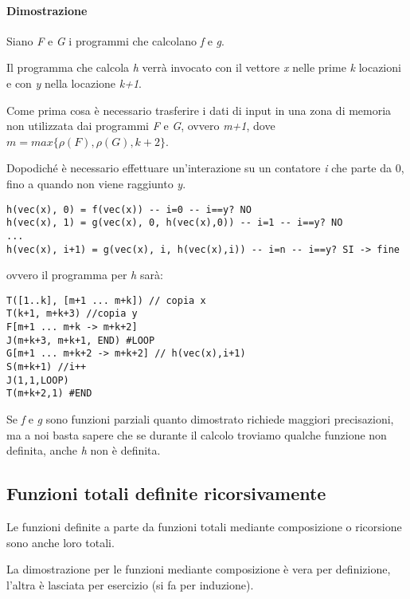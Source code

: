 \paragraph{Dimostrazione}\label{dimostrazione-1}

Siano \emph{F} e \emph{G} i programmi che calcolano \emph{f} e \emph{g}.

Il programma che calcola \emph{h} verrà invocato con il vettore \emph{x}
nelle prime \emph{k} locazioni e con \emph{y} nella locazione
\emph{k+1}.

Come prima cosa è necessario trasferire i dati di input in una zona di
memoria non utilizzata dai programmi \emph{F} e \emph{G}, ovvero
\emph{m+1}, dove $m = max\{\rho(F), \rho(G), k+2\}$.

Dopodiché è necessario effettuare un'interazione su un contatore
\emph{i} che parte da 0, fino a quando non viene raggiunto \emph{y}.

\begin{verbatim}
h(vec(x), 0) = f(vec(x)) -- i=0 -- i==y? NO
h(vec(x), 1) = g(vec(x), 0, h(vec(x),0)) -- i=1 -- i==y? NO
...
h(vec(x), i+1) = g(vec(x), i, h(vec(x),i)) -- i=n -- i==y? SI -> fine
\end{verbatim}

ovvero il programma per \emph{h} sarà:

\begin{lstlisting}[language=URM]
T([1..k], [m+1 ... m+k]) // copia x
T(k+1, m+k+3) //copia y
F[m+1 ... m+k -> m+k+2]
J(m+k+3, m+k+1, END) #LOOP
G[m+1 ... m+k+2 -> m+k+2] // h(vec(x),i+1)
S(m+k+1) //i++
J(1,1,LOOP)
T(m+k+2,1) #END
\end{lstlisting}

Se \emph{f} e \emph{g} sono funzioni parziali quanto dimostrato richiede
maggiori precisazioni, ma a noi basta sapere che se durante il calcolo
troviamo qualche funzione non definita, anche \emph{h} non è definita.

\subsection{Funzioni totali definite ricorsivamente}\label{osservazione-senza-titolo}

Le funzioni definite a parte da funzioni totali mediante composizione o
ricorsione sono anche loro totali.

La dimostrazione per le funzioni mediante composizione è vera per
definizione, l'altra è lasciata per esercizio (si fa per induzione).

